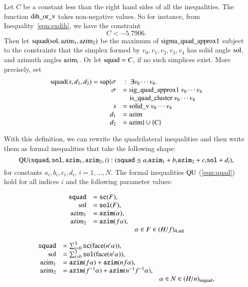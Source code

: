 Let $C$ be a constant less than the right hand sides of all the
inequalities.  The function ${\operatorname{dih\_or\_v}}$ takes non-negative
values.  So for instance, from Inequality~\ref{eqn:exdih}, we have
the constraint
    $$C < -5.7906.$$
Then let ${\operatorname{squad}}({\operatorname{sol}},{\operatorname{azim}}_1,{\operatorname{azim}}_2)$ be the
maximum of ${\operatorname{sigma\_quad\_approx1}}$ subject to the constraints
that the simplex formed by $v_0,v_1,v_2,v_3,v_4$ has solid angle
${\operatorname{sol}}$, and azimuth angles ${\operatorname{azim}}_i$.  Or let
${\operatorname{squad}}=C$, if no such simplices exist. More precisely, set
    $$\begin{array}{rll}
    {\operatorname{squad}}(s,d_1,d_2) =
        \sup \{\sigma&\ :\  \exists v_0\cdots v_4.\ \\
           \sigma &= {\operatorname{sig\_quad\_approx1}}\ v_0\cdots v_4 \\
           &\quad {\operatorname{is\_quad\_cluster}}\ v_0\cdots v_4\\
           s &= {\operatorname{solid\_v}}\ v_0\cdots v_4\\
           d_1 &= {\operatorname{azim}}\\
           d_2 &= {\operatorname{azim}}
           \}\cup \{C\}
    \end{array}
    $$




With this definition, we can rewrite the quadrilateral
inequalities and then write them as formal inequalities that take
the following shape:
    \begin{equation}
    \label{eqn:quad}
    {\operatorname{QU}}({\operatorname{{\texttt{squad}}}},{\operatorname{{\texttt{sol}}}},{\operatorname{{\texttt{azim}}}}_1,{\operatorname{{\texttt{azim}}}}_2,i) :
    ({\operatorname{{\texttt{squad}}}} \preceq a_i {\operatorname{{\texttt{azim}}}}_1 + b_i {\operatorname{{\texttt{azim}}}}_2 + c_i {\operatorname{{\texttt{sol}}}}
    + d_i),
    \end{equation}
for constants $a_i,b_i,c_i,d_i$, $i=1,\ldots,N$.  The formal
inequalities ${\operatorname{QU}}$ (\ref{eqn:quad}) hold for all indices $i$
and the following parameter values:


\begin{equation}
  \begin{array}{rll}
    {\operatorname{{\texttt{squad}}}} &= {\operatorname{{\texttt{sc}}}}(F),\\
    {\operatorname{sol}} &= {\operatorname{{\texttt{sol}}}}(F),\\
    {\operatorname{azim}}_1 &= {\operatorname{{\texttt{azim}}}}(\alpha),\\
    {\operatorname{azim}}_2 &= {\operatorname{{\texttt{azim}}}}(f\alpha),\\
    &&\alpha\in F\in (H/f)_{4,{\operatorname{std}}}
   \end{array}
\end{equation}

\begin{equation}
\begin{array}{rll}
    {\operatorname{{\texttt{squad}}}} &=\sum_{i=0}^3{\operatorname{{\texttt{sc}}}}({\operatorname{face}}(n^i\alpha)),\\
    {\operatorname{sol}} &=
          \sum_{i=0}^3{\operatorname{{\texttt{sol}}}}({\operatorname{face}}(n^i\alpha)),\\
    {\operatorname{azim}}_1 &={\operatorname{{\texttt{azim}}}}(f\alpha)+{\operatorname{{\texttt{azim}}}}(n f\alpha),\\
     {\operatorname{azim}}_2 &= {\operatorname{{\texttt{azim}}}}(f^{-1}\alpha)+{\operatorname{{\texttt{azim}}}}(n^{-1}f^{-1}\alpha),
         \\
    &&\alpha\in N\in (H/n)_{{\operatorname{inquad}}},\\
\end{array}
\end{equation}

